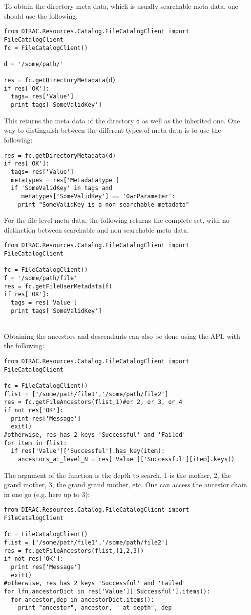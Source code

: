 \documentclass[11pt,a4paper]{scrartcl}
\begin{document}
To obtain the directory meta data, which is usually searchable meta data, one
should use the following:
\begin{lstlisting}
from DIRAC.Resources.Catalog.FileCatalogClient import FileCatalogClient
fc = FileCatalogClient()

d = '/some/path/' 

res = fc.getDirectoryMetadata(d)
if res['OK']:   
  tags= res['Value']
  print tags['SomeValidKey']
\end{lstlisting}
This returns the meta data of the directory \lstinline|d| as well as the
inherited one. One way to distinguish between the different types of meta data
is to use the following:
\begin{lstlisting}
res = fc.getDirectoryMetadata(d)
if res['OK']:   
  tags= res['Value']
  metatypes = res['MetadataType']
  if 'SomeValidKey' in tags and 
     metatypes['SomeValidKey'] == 'OwnParameter':
    print "SomeValidKey is a non searchable metadata"
\end{lstlisting}

For the file level meta data, the following returns the complete set, with no
distinction between searchable and non searchable meta data.
\begin{lstlisting}
from DIRAC.Resources.Catalog.FileCatalogClient import FileCatalogClient

fc = FileCatalogClient()
f = '/some/path/file'
res = fc.getFileUserMetadata(f)
if res['OK']:   
  tags = res['Value']
  print tags['SomeValidKey']
\end{lstlisting}

~\\

Obtaining the ancestors and descendants can also be done using the API, with the
following:
\begin{lstlisting}
from DIRAC.Resources.Catalog.FileCatalogClient import FileCatalogClient

fc = FileCatalogClient()
flist = ['/some/path/file1','/some/path/file2']
res = fc.getFileAncestors(flist,1)#or 2, or 3, or 4
if not res['OK']:
  print res['Message']
  exit()
#otherwise, res has 2 keys 'Successful' and 'Failed'  
for item in flist:
  if res['Value']['Successful'].has_key(item):
    ancestors_at_level_N = res['Value']['Successful'][item].keys()
\end{lstlisting}
The argument of the function is the depth to search, 1 is the mother, 2, the
grand mother, 3, the grand grand mother, etc. One can access the ancestor chain
in one go (e.g. here up to 3):
\begin{lstlisting}
from DIRAC.Resources.Catalog.FileCatalogClient import FileCatalogClient

fc = FileCatalogClient()
flist = ['/some/path/file1','/some/path/file2']
res = fc.getFileAncestors(flist,[1,2,3])
if not res['OK']:
  print res['Message']
  exit()
#otherwise, res has 2 keys 'Successful' and 'Failed'  
for lfn,ancestorDict in res['Value']['Successful'].items():
  for ancestor,dep in ancestorDict.items():
    print "ancestor", ancestor, " at depth", dep
\end{lstlisting}
\end{document}

